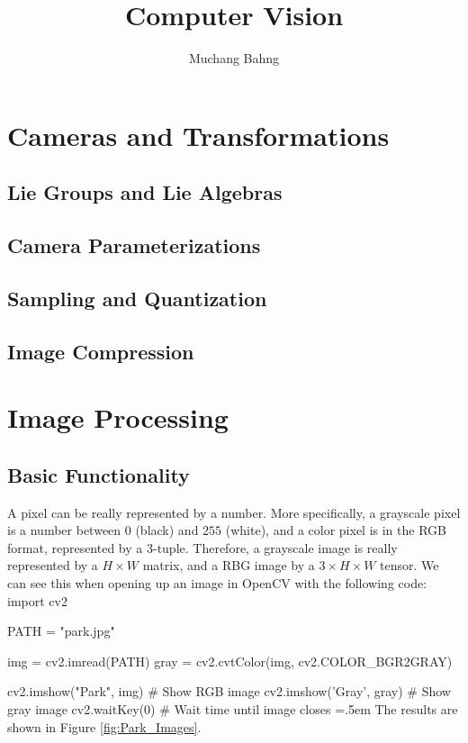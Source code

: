 \documentclass{article}
\newenvironment{cverbatim}
 {\SaveVerbatim{cverb}}
 {\endSaveVerbatim
  \flushleft\fboxrule=0pt\fboxsep=.5em
  \colorbox{cverbbg}{%
    \makebox[\dimexpr\linewidth-2\fboxsep][l]{\BUseVerbatim{cverb}}%
  }
  \endflushleft
}
\theoremstyle{definition}
\theoremstyle{remark}
\theoremstyle{definition}
\begin{document}
\pagestyle{fancy}

\cfoot{\thepage / \pageref{LastPage}}

\title{Computer Vision}
\author{Muchang Bahng}

\maketitle

\tableofcontents

\pagebreak


\section{Cameras and Transformations}

  \subsection{Lie Groups and Lie Algebras}

  \subsection{Camera Parameterizations}

  \subsection{Sampling and Quantization}

  \subsection{Image Compression}


\section{Image Processing}

\subsection{Basic Functionality}

  A pixel can be really represented by a number. More specifically, a grayscale pixel is a number between $0$ (black) and $255$ (white), and a color pixel is in the RGB format, represented by a $3$-tuple. Therefore, a grayscale image is really represented by a $H \times W$ matrix, and a RBG image by a $3 \times H \times W$ tensor. We can see this when opening up an image in OpenCV with the following code: 
  \begin{cverbatim}
  import cv2 

  PATH = "park.jpg"

  img = cv2.imread(PATH)
  gray = cv2.cvtColor(img, cv2.COLOR_BGR2GRAY) 

  cv2.imshow("Park", img)     # Show RGB image
  cv2.imshow('Gray', gray)    # Show gray image
  cv2.waitKey(0)              # Wait time until image closes
  \end{cverbatim}
  The results are shown in Figure \ref{fig:Park_Images}. 
\end{document}
